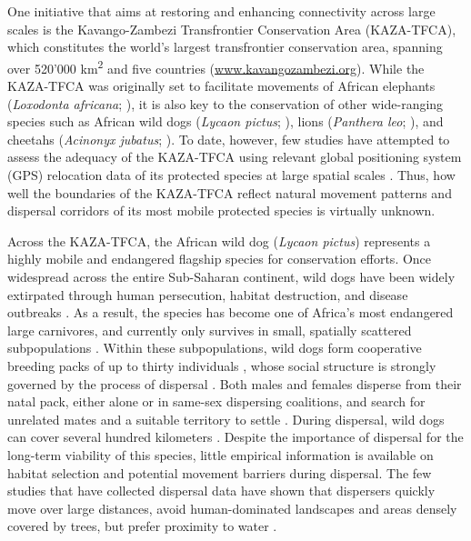 \documentclass[abstract=on,10pt,a4paper,bibliography=totocnumbered]{article}
\begin{document}
One initiative that aims at restoring and enhancing connectivity across large
scales is the Kavango-Zambezi Transfrontier Conservation Area (KAZA-TFCA), which
constitutes the world's largest transfrontier conservation area, spanning over
520'000 km\textsuperscript{2} and five countries (\url{www.kavangozambezi.org}).
While the KAZA-TFCA was originally set to facilitate movements of African
elephants (\textit{Loxodonta africana}; \citealp{Tshipa.2017}), it is also key
to the conservation of other wide-ranging species such as African wild dogs
(\textit{Lycaon pictus}; \citealp{Woodroffe.2012, Cozzi.2020}), lions
(\textit{Panthera leo}; \citealp{Elliot.2014, Cushman.2018}), and cheetahs
(\textit{Acinonyx jubatus}; \citealp{Weise.2017}). To date, however, few studies
have attempted to assess the adequacy of the KAZA-TFCA using relevant global
positioning system (GPS) relocation data of its protected species at large
spatial scales \citep{Elliot.2014, Tshipa.2017}. Thus, how well the boundaries
of the KAZA-TFCA reflect natural movement patterns and dispersal corridors of
its most mobile protected species is virtually unknown.

Across the KAZA-TFCA, the African wild dog (\textit{Lycaon pictus}) represents a
highly mobile and endangered flagship species for conservation efforts. Once
widespread across the entire Sub-Saharan continent, wild dogs have been widely
extirpated through human persecution, habitat destruction, and disease outbreaks
\citep{Woodroffe.2012}. As a result, the species has become one of Africa's most
endangered large carnivores, and currently only survives in small, spatially
scattered subpopulations \citep{Woodroffe.2012}. Within these subpopulations,
wild dogs form cooperative breeding packs of up to thirty individuals
\citep{Creel.2002}, whose social structure is strongly governed by the process
of dispersal \citep{McNutt.1996, Behr.2020}. Both males and females disperse
from their natal pack, either alone or in same-sex dispersing coalitions, and
search for unrelated mates and a suitable territory to settle
\citep{McNutt.1996, Cozzi.2020, Behr.2020}. During dispersal, wild dogs can
cover several hundred kilometers \citep{Masenga.2016, Woodroffe.2019,
Cozzi.2020}. Despite the importance of dispersal for the long-term viability of
this species, little empirical information is available on habitat selection and
potential movement barriers during dispersal. The few studies that have
collected dispersal data have shown that dispersers quickly move over large
distances, avoid human-dominated landscapes and areas densely covered by trees,
but prefer proximity to water \citep{Masenga.2016, Woodroffe.2019, Oneill.2020,
Cozzi.2020}.
\end{document}
